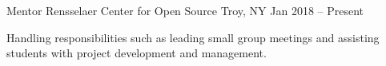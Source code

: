 


\begin{cventries}

  \cventry
  {Mentor}
  {Rensselaer Center for Open Source}
  {Troy, NY}
  {Jan 2018 -- Present}
  {
    \begin{cvitems}
      \item Handling responsibilities such as leading small group meetings and assisting students with project development and management.
    \end{cvitems}
  }



\end{cventries}
